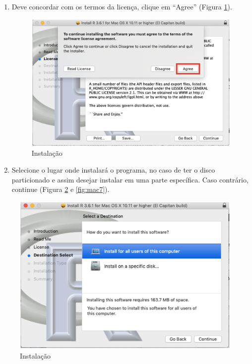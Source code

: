\documentclass[
]{book}
\providecommand{\tightlist}{%
  \setlength{\itemsep}{0pt}\setlength{\parskip}{0pt}}
\begin{document}
\begin{enumerate}
\def\labelenumi{\arabic{enumi})}
\setcounter{enumi}{4}
\tightlist
\item
  Deve concordar com os termos da licença, clique em ``Agree'' (Figura \ref{fig:mac5}).

  \begin{figure}
  \includegraphics[width=1\linewidth]{figures/mac_R_5} \caption{\label{fig:mac5} Instalação}\label{fig:mac5}
  \end{figure}
\item
  Selecione o lugar onde instalará o programa, no caso de ter o disco particionado e assim desejar instalar em uma parte específica. Caso contrário, continue (Figura \ref{fig:mac6} e \ref{fig:mac7}).
\end{enumerate}

\begin{figure}
\includegraphics[width=1\linewidth]{figures/mac_R_6} \caption{\label{fig:mac6} Instalação}\label{fig:mac6}
\end{figure}
\end{document}
